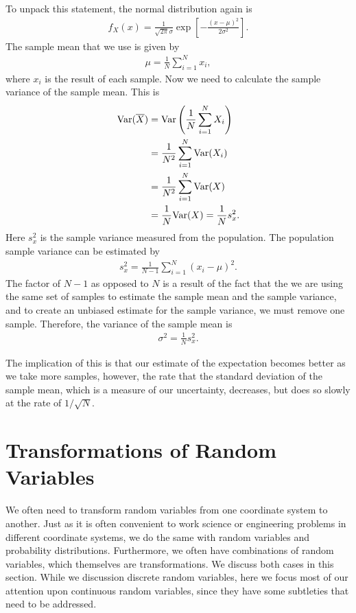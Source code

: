 To unpack this statement, the normal distribution again is
\begin{align}
  f_X(x) = \frac{1}{\sqrt{2\pi} \sigma} \exp \left[ -\frac{ (x - \mu)^2 }{ 2\sigma^2 } \right] . \nonumber
\end{align}
The sample mean that we use is given by
\begin{align}
  \mu = \frac{1}{N} \sum_{i=1}^N x_i ,
\end{align}
where $x_i$ is the result of each sample. Now we need to calculate the sample variance of the sample mean. This is
\begin{align}
  \textrm{Var}(\overline{X}) &= \textrm{Var} \left( \frac{1}{N} \sum_{i=1}^N X_i \right) \nonumber \\*
  &= \frac{1}{N^2} \sum_{i=1}^N \textrm{Var} ( X_i ) \nonumber \\*
  &= \frac{1}{N^2} \sum_{i=1}^N \textrm{Var} ( X ) \nonumber \\*
  &= \frac{1}{N} \textrm{Var} ( X ) = \frac{1}{N} s_x^2 .
\end{align}
Here $s_x^2$ is the sample variance measured from the population. The population sample variance can be estimated by
\begin{align}
  s_x^2 = \frac{1}{N - 1} \sum_{i=1}^N ( x_i - \mu )^2 .
\end{align}
The factor of $N - 1$ as opposed to $N$ is a result of the fact that the we are using the same set of samples to estimate the sample mean and the sample variance, and to create an unbiased estimate for the sample variance, we must remove one sample. Therefore, the variance of the sample mean is
\begin{align}
  \sigma^2 = \frac{1}{N} s_x^2 .
\end{align}

The implication of this is that our estimate of the expectation becomes better as we take more samples, however, the rate that the standard deviation of the sample mean, which is a measure of our uncertainty, decreases, but does so slowly at the rate of $1/\sqrt{N}$.

\section{Transformations of Random Variables}

We often need to transform random variables from one coordinate system to another. Just as it is often convenient to work science or engineering problems in different coordinate systems, we do the same with random variables and probability distributions. Furthermore, we often have combinations of random variables, which themselves are transformations. We discuss both cases in this section. While we discussion discrete random variables, here we focus most of our attention upon continuous random variables, since they have some subtleties that need to be addressed.

